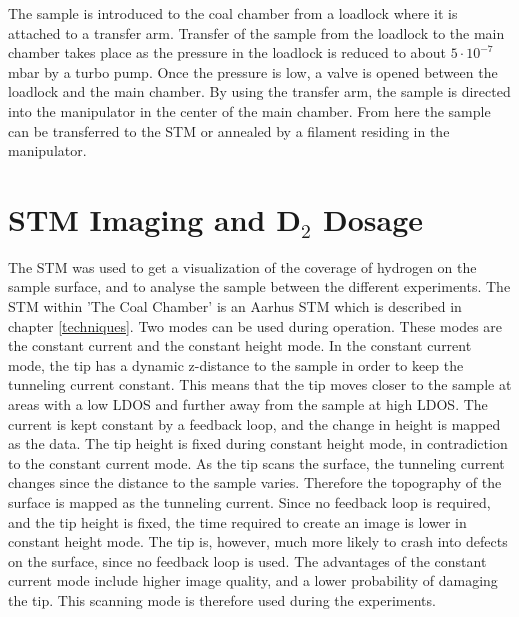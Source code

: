   The sample is introduced to the coal chamber from a loadlock where it is attached to a transfer arm. Transfer of the sample from the loadlock to the main chamber takes place as the pressure in the loadlock is reduced to about $5\cdot 10^{-7}$ mbar by a turbo pump. Once the pressure is low, a valve is opened between the loadlock and the main chamber. By using the transfer arm, the sample is directed into the manipulator in the center of the main chamber. From here the sample can be transferred to the STM or annealed by a filament residing in the manipulator.

\section{STM Imaging and D$_2$ Dosage}

The STM was used to get a visualization of the coverage of hydrogen on the sample surface, and to analyse the sample between the different experiments. The STM within 'The Coal Chamber' is an Aarhus STM which is described in chapter \ref{techniques}. Two modes can be used during operation. These modes are the constant current and the constant height mode. In the constant current mode, the tip has a dynamic z-distance to the sample in order to keep the tunneling current constant. This means that the tip moves closer to the sample at areas with a low LDOS and further away from the sample at high LDOS. The current is kept constant by a feedback loop, and the change in height is mapped as the data. The tip height is fixed during constant height mode, in contradiction to the constant current mode. As the tip scans the surface, the tunneling current changes since the distance to the sample varies. Therefore the topography of the surface is mapped as the tunneling current. Since no feedback loop is required, and the tip height is fixed, the time required to create an image is lower in constant height mode. The tip is, however, much more likely to crash into defects on the surface, since no feedback loop is used. The advantages of the constant current mode include higher image quality, and a lower probability of damaging the tip. This scanning mode is therefore used during the experiments.

